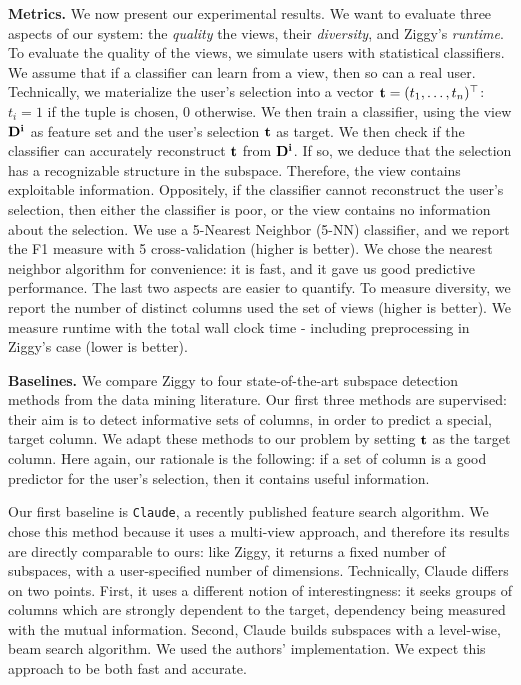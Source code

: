 \textbf{Metrics.} We now present our experimental results. We want to evaluate
three aspects of our system: the \emph{quality} the views, their
\emph{diversity}, and Ziggy's \emph{runtime}. To evaluate the quality of the
views, we simulate users with statistical classifiers. We assume that if a
classifier can learn from a view, then so can a real user. Technically, we
materialize the user's selection into a vector $\mathbf{t} = (t_1, \ldots,
t_n)^\top$: $t_i=1$ if the tuple is chosen, 0 otherwise.  We then train a
classifier, using the view $\bf{D}^i$ as feature set and the user's selection
$\bf{t}$ as target. We then check if the classifier can accurately reconstruct
$\bf{t}$ from $\bf{D}^i$. If so, we deduce that the selection has a
recognizable structure in the subspace.  Therefore, the view contains
exploitable information. Oppositely, if the classifier cannot reconstruct the
user's selection, then either the classifier is poor, or the view contains no
information about the selection. We use a 5-Nearest Neighbor (5-NN) classifier,
and we report the F1 measure with 5 cross-validation (higher is better). We
chose the nearest neighbor algorithm for convenience: it is fast, and it gave
us good predictive performance. The
last two aspects are easier to quantify. To measure diversity, we report the
number of distinct columns used the set of views (higher is better). We measure
runtime with the total wall clock time - including preprocessing in Ziggy's
case (lower is better).

\textbf{Baselines.} We compare Ziggy to four state-of-the-art subspace
detection methods from the data mining literature. Our first three methods are
supervised: their aim is to detect informative sets of columns, in order to
predict a special, target column. We adapt these methods to our problem by
setting $\bf{t}$ as the target column. Here again, our rationale is the
following: if a set of column is a good predictor for the user's selection,
then it contains useful information.

Our first baseline is \texttt{Claude}, a recently published feature search
algorithm. We chose this method because it uses a multi-view approach, and
therefore its results are directly comparable to ours: like Ziggy, it returns a
fixed number of subspaces, with a user-specified number of dimensions.
Technically, Claude differs on two points. First, it uses a different notion of
interestingness: it seeks groups of columns which are strongly dependent to the
target, dependency being measured with the mutual information. Second, Claude
builds subspaces with a level-wise, beam search algorithm. We used the authors'
implementation.  We expect this approach to be both fast and accurate.

